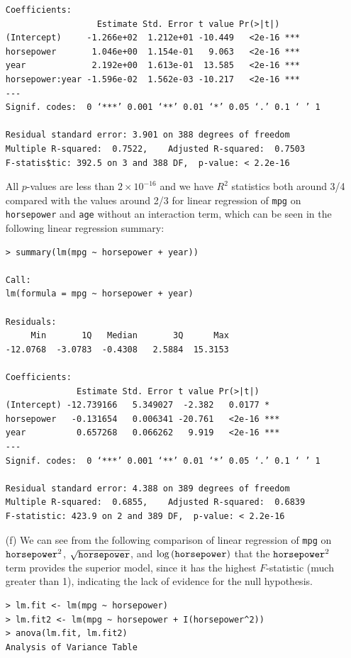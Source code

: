 \begin{itemize}
\begin{lstlisting}
Coefficients:
                  Estimate Std. Error t value Pr(>|t|)
(Intercept)     -1.266e+02  1.212e+01 -10.449   <2e-16 ***
horsepower       1.046e+00  1.154e-01   9.063   <2e-16 ***
year             2.192e+00  1.613e-01  13.585   <2e-16 ***
horsepower:year -1.596e-02  1.562e-03 -10.217   <2e-16 ***
---
Signif. codes:  0 ‘***’ 0.001 ‘**’ 0.01 ‘*’ 0.05 ‘.’ 0.1 ‘ ’ 1

Residual standard error: 3.901 on 388 degrees of freedom
Multiple R-squared:  0.7522,    Adjusted R-squared:  0.7503
F-statis$tic: 392.5 on 3 and 388 DF,  p-value: < 2.2e-16

        \end{lstlisting}
        All $p$-values are less than $2 \times 10^{-16}$ and we have
        $R^2$ statistics
        both around 3/4 compared with the values around 2/3 for linear regression
        of \verb|mpg| on \verb|horsepower| and \verb|age| without an
        interaction term,
        which can be seen in the following linear regression summary:
        \begin{lstlisting}
> summary(lm(mpg ~ horsepower + year))

Call:
lm(formula = mpg ~ horsepower + year)

Residuals:
     Min       1Q   Median       3Q      Max
-12.0768  -3.0783  -0.4308   2.5884  15.3153

Coefficients:
              Estimate Std. Error t value Pr(>|t|)
(Intercept) -12.739166   5.349027  -2.382   0.0177 *
horsepower   -0.131654   0.006341 -20.761   <2e-16 ***
year          0.657268   0.066262   9.919   <2e-16 ***
---
Signif. codes:  0 ‘***’ 0.001 ‘**’ 0.01 ‘*’ 0.05 ‘.’ 0.1 ‘ ’ 1

Residual standard error: 4.388 on 389 degrees of freedom
Multiple R-squared:  0.6855,    Adjusted R-squared:  0.6839
F-statistic: 423.9 on 2 and 389 DF,  p-value: < 2.2e-16
        \end{lstlisting}
    \item[(f)] We can see from the following comparison of linear regression of
        \verb|mpg| on $\verb|horsepower|^2$, $\sqrt{\verb|horsepower|}$, and
        $\log{(\verb|horsepower|)}$ that the $\verb|horsepower|^2$ term provides the
        superior model, since it has the highest $F$-statistic (much greater than
        1), indicating the lack of evidence for the null hypothesis.
        \begin{lstlisting}
> lm.fit <- lm(mpg ~ horsepower)
> lm.fit2 <- lm(mpg ~ horsepower + I(horsepower^2))
> anova(lm.fit, lm.fit2)
Analysis of Variance Table


\end{lstlisting}
\end{itemize}
